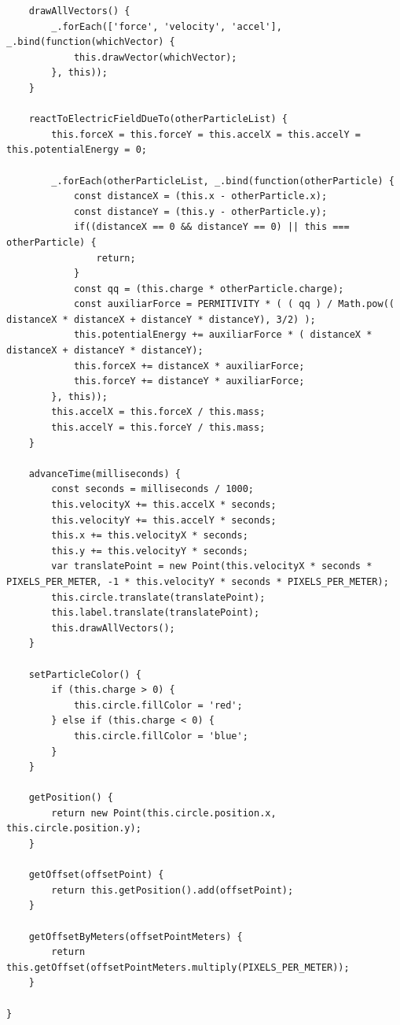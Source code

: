 \documentclass[11pt]{article}
\begin{document}
\begin{verbatim}
    drawAllVectors() {
        _.forEach(['force', 'velocity', 'accel'], _.bind(function(whichVector) {
            this.drawVector(whichVector);
        }, this));
    }

    reactToElectricFieldDueTo(otherParticleList) {
        this.forceX = this.forceY = this.accelX = this.accelY = this.potentialEnergy = 0;

        _.forEach(otherParticleList, _.bind(function(otherParticle) {
            const distanceX = (this.x - otherParticle.x);
            const distanceY = (this.y - otherParticle.y);
            if((distanceX == 0 && distanceY == 0) || this === otherParticle) {
                return;
            }
            const qq = (this.charge * otherParticle.charge);
            const auxiliarForce = PERMITIVITY * ( ( qq ) / Math.pow(( distanceX * distanceX + distanceY * distanceY), 3/2) );
            this.potentialEnergy += auxiliarForce * ( distanceX * distanceX + distanceY * distanceY);
            this.forceX += distanceX * auxiliarForce;
            this.forceY += distanceY * auxiliarForce;
        }, this));
        this.accelX = this.forceX / this.mass;
        this.accelY = this.forceY / this.mass;
    }

    advanceTime(milliseconds) {
        const seconds = milliseconds / 1000;
        this.velocityX += this.accelX * seconds;
        this.velocityY += this.accelY * seconds;
        this.x += this.velocityX * seconds;
        this.y += this.velocityY * seconds;
        var translatePoint = new Point(this.velocityX * seconds * PIXELS_PER_METER, -1 * this.velocityY * seconds * PIXELS_PER_METER);
        this.circle.translate(translatePoint);
        this.label.translate(translatePoint);
        this.drawAllVectors();
    }

    setParticleColor() {
        if (this.charge > 0) {
            this.circle.fillColor = 'red';
        } else if (this.charge < 0) {
            this.circle.fillColor = 'blue';
        }
    }

    getPosition() {
        return new Point(this.circle.position.x, this.circle.position.y);
    }

    getOffset(offsetPoint) {
        return this.getPosition().add(offsetPoint);
    }

    getOffsetByMeters(offsetPointMeters) {
        return this.getOffset(offsetPointMeters.multiply(PIXELS_PER_METER));
    }

}
\end{verbatim}
\end{document}
